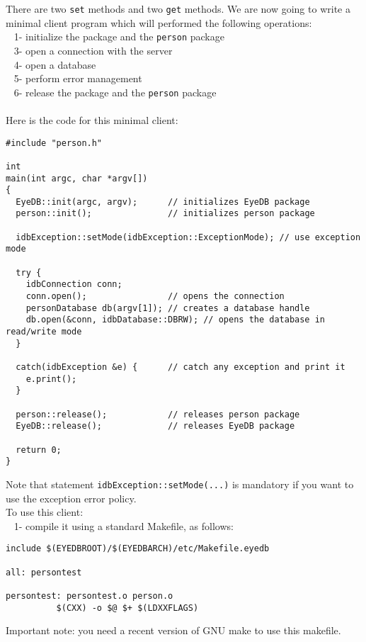 There are two \texttt{set} methods and two \texttt{get} methods.
We are now going to write a minimal client program which will performed
the following operations:\\
\mbox{ } 1- initialize the \eyedb package and the \texttt{person} package\\
\mbox{ } 3- open a connection with the \eyedb server\\
\mbox{ } 4- open a database\\
\mbox{ } 5- perform error management\\
\mbox{ } 6- release the \eyedb package and the \texttt{person} package\\
\\
Here is the code for this minimal client:
\verbsize \begin{verbatim}
#include "person.h"

int
main(int argc, char *argv[])
{
  EyeDB::init(argc, argv);      // initializes EyeDB package
  person::init();               // initializes person package

  idbException::setMode(idbException::ExceptionMode); // use exception mode

  try {
    idbConnection conn;
    conn.open();                // opens the connection
    personDatabase db(argv[1]); // creates a database handle
    db.open(&conn, idbDatabase::DBRW); // opens the database in read/write mode
  }

  catch(idbException &e) {      // catch any exception and print it
    e.print();
  }

  person::release();            // releases person package
  EyeDB::release();             // releases EyeDB package

  return 0;
}
\end{verbatim}
\normalsize
Note that statement \texttt{idbException::setMode(...)} is mandatory
if you want to use the exception error policy.
\\
To use this client:\\
\mbox{ } 1- compile it using a standard Makefile, as follows:
\verbsize \begin{verbatim}
include $(EYEDBROOT)/$(EYEDBARCH)/etc/Makefile.eyedb

all: persontest

persontest: persontest.o person.o
          $(CXX) -o $@ $+ $(LDXXFLAGS)
\end{verbatim}
\normalsize
Important note: you need a recent version of GNU make to use this makefile.
